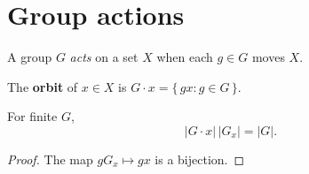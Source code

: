 \documentclass{article}
\begin{document}
\section{Group actions}
A group $G$ \emph{acts} on a set $X$ when each $g \in G$ moves $X$.

\begin{definition}[Orbit]
  The \textbf{orbit} of $x \in X$ is $G \cdot x = \{\, g x : g \in G \,\}$.
\end{definition}

\begin{theorem}
  For finite $G$,
  \[ \lvert G \cdot x \rvert \, \lvert G_x \rvert = \lvert G \rvert. \]
\end{theorem}

\begin{proof}
  The map $g G_x \mapsto g x$ is a bijection. %
\end{proof}
\end{document}
